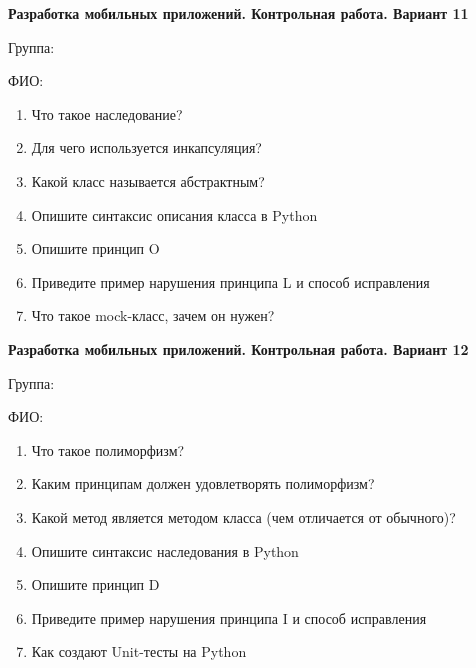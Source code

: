 \documentclass[12pt]{article}
\begin{document}
\vspace{40pt}\begin{minipage}{\textwidth}
\textbf{Разработка мобильных приложений. Контрольная работа. Вариант 11}

Группа: \underline{\hspace{3cm}}

ФИО: \underline{\hspace{10cm}}

\begin{enumerate}
\item Что такое наследование?
\item Для чего используется инкапсуляция?
\item Какой класс называется абстрактным?
\item Опишите синтаксис описания класса в Python
\item Опишите принцип O
\item Приведите пример нарушения принципа L и способ исправления
\item Что такое mock-класс, зачем он нужен?

\end{enumerate}
\end{minipage}

\vspace{40pt}\begin{minipage}{\textwidth}
\textbf{Разработка мобильных приложений. Контрольная работа. Вариант 12}

Группа: \underline{\hspace{3cm}}

ФИО: \underline{\hspace{10cm}}

\begin{enumerate}
\item Что такое полиморфизм?
\item Каким принципам должен удовлетворять полиморфизм?
\item Какой метод является методом класса (чем отличается от обычного)?
\item Опишите синтаксис наследования в Python
\item Опишите принцип D
\item Приведите пример нарушения принципа I и способ исправления
\item Как создают Unit-тесты на Python

\end{enumerate}
\end{minipage}
\end{document}
